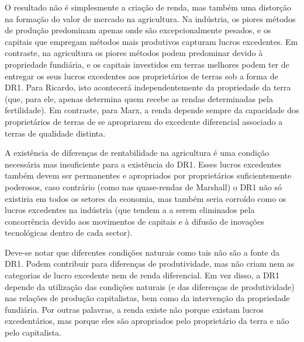  \par 
O resultado não é simplesmente a criação de renda, mas também uma distorção na formação do valor de mercado na agricultura. Na indústria, os piores métodos de produção predominam apenas onde são excepcionalmente pesados, e os capitais que empregam métodos mais produtivos capturam lucros excedentes. Em contraste, na agricultura os piores métodos podem predominar devido à propriedade fundiária, e os capitais investidos em terras melhores podem ter de entregar os seus lucros excedentes aos proprietários de terras sob a forma de DR1. Para Ricardo, isto acontecerá independentemente da propriedade da terra (que, para ele, apenas determina quem recebe as rendas determinadas pela fertilidade). Em contraste, para Marx, a renda depende sempre da capacidade dos proprietários de terras de se apropriarem do excedente diferencial associado a terras de qualidade distinta.
 \par 
A existência de diferenças de rentabilidade na agricultura é uma condição necessária mas insuficiente para a existência do DR1. Esses lucros excedentes também devem ser permanentes e apropriados por proprietários suficientemente poderosos, caso contrário (como nas quase-rendas de Marshall) o DR1 não só existiria em todos os setores da economia, mas também seria corroído como os lucros excedentes na indústria (que tendem a a serem eliminados pela concorrência devido aos movimentos de capitais e à difusão de inovações tecnológicas dentro de cada sector).
 \par 
Deve-se notar que diferentes condições naturais como tais não são a fonte da DR1. Podem contribuir para diferenças de produtividade, mas não criam nem as categorias de lucro excedente nem de renda diferencial. Em vez disso, a DR1 depende da utilização das condições naturais (e das diferenças de produtividade) nas relações de produção capitalistas, bem como da intervenção da propriedade fundiária. Por outras palavras, a renda existe não porque existam lucros excedentários, mas porque eles são apropriados pelo proprietário da terra e não pelo capitalista.
 \par 
